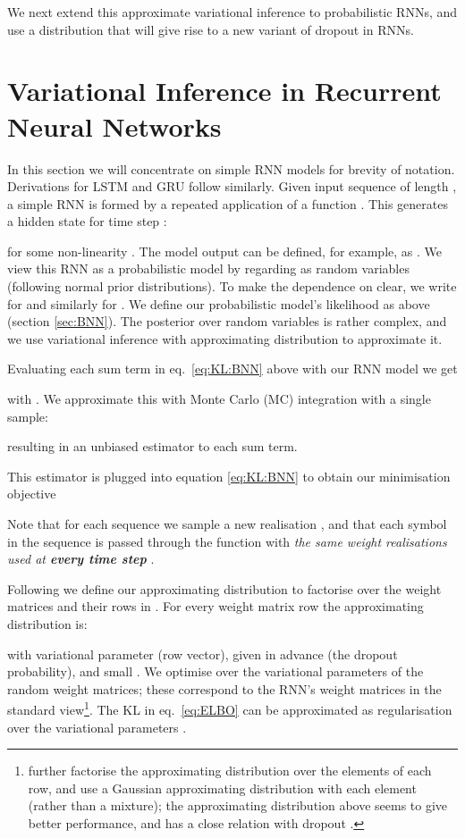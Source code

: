 \documentclass{article}
\newcommand{\bo}{\text{\boldmath}}
\theoremstyle{definition}
\begin{document}
We next extend this approximate variational inference to probabilistic RNNs, and use a  distribution that will give rise to a new variant of dropout in RNNs.


\section{Variational Inference in Recurrent Neural Networks}

In this section we will concentrate on simple RNN models for brevity of notation. Derivations for LSTM and GRU follow similarly.
Given input sequence  of length , a simple RNN is formed by a repeated application of a function . This generates a hidden state  for time step :

for some non-linearity .
The model output can be defined, for example, as . We view this RNN as a probabilistic model by regarding  as random variables (following normal prior distributions).
To make the dependence on  clear, we write  for  and similarly for .
We define our probabilistic model's likelihood as above (section \ref{sec:BNN}).
The posterior over random variables  is rather complex, and we use variational inference with approximating distribution  to approximate it.

Evaluating each sum term in eq.\ \eqref{eq:KL:BNN} above with our RNN model we get

with . We approximate this with Monte Carlo (MC) integration with a single sample:
\newcommand{\boh}{{\widehat{\bo}}}

resulting in an unbiased estimator to each sum term.

This estimator is plugged into equation \eqref{eq:KL:BNN} to obtain our minimisation objective

Note that for each sequence  we sample a new realisation , and that each symbol in the sequence  is passed through the function  with \textit{the same weight realisations  used at \textbf{every time step }}.

Following \citep{Gal2015DropoutB} we define our approximating distribution to factorise over the weight matrices and their rows in . For every weight matrix row  the approximating distribution is:

with  variational parameter (row vector),  given in advance (the dropout probability), and small . We optimise over  the variational parameters of the random weight matrices; these correspond to the RNN's weight matrices in the standard view\footnote{\citet{graves2013speech} further factorise the approximating distribution over the elements of each row, and use a Gaussian approximating distribution with each element (rather than a mixture); the approximating distribution above seems to give better performance, and has a close relation with dropout \citep{Gal2015DropoutB}.}. The KL in eq.\ \eqref{eq:ELBO} can be approximated as 
 regularisation over the variational parameters 
\citep{Gal2015DropoutB}. 
\end{document}
